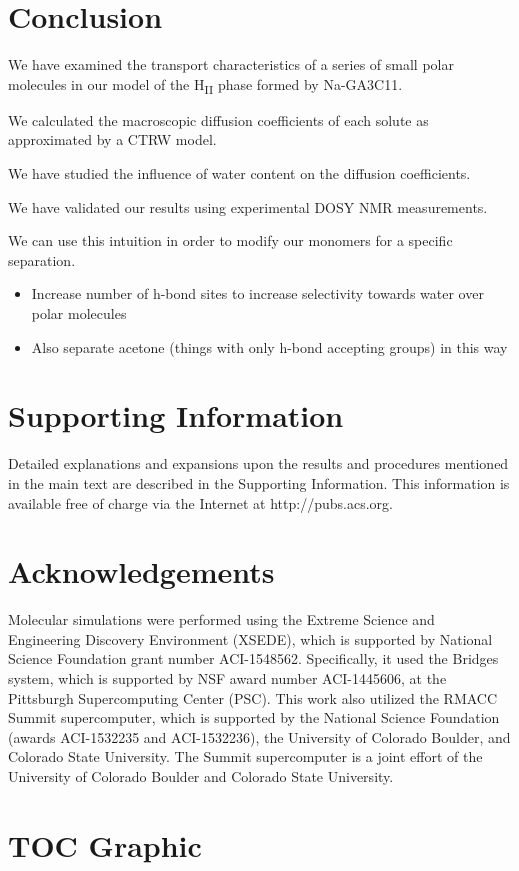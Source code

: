 \documentclass{article}
\begin{document}
   
  \section{Conclusion}

  We have examined the transport characteristics of a series of small polar
  molecules in our model of the H\textsubscript{II} phase formed by 
  Na-GA3C11.

  We calculated the macroscopic diffusion coefficients of each solute as 
  approximated by a CTRW model.

  We have studied the influence of water content on the diffusion coefficients.

  We have validated our results using experimental DOSY NMR measurements.

  We can use this intuition in order to modify our monomers for a specific 
  separation.
  \begin{itemize}
	\item Increase number of h-bond sites to increase selectivity towards water 
	over polar molecules
	\item Also separate acetone (things with only h-bond accepting groups) in this way
  \end{itemize}
  
 
  \section*{Supporting Information}

  Detailed explanations and expansions upon the results and procedures mentioned in
  the main text are described in the Supporting Information. This information is
  available free of charge via the Internet at http://pubs.acs.org.

  \section*{Acknowledgements}

  Molecular simulations were performed using the Extreme Science and
  Engineering Discovery Environment (XSEDE), which is supported by National
  Science Foundation grant number ACI-1548562. Specifically, it used the Bridges
  system, which is supported by NSF award number ACI-1445606, at the Pittsburgh
  Supercomputing Center (PSC). This work also utilized the RMACC Summit supercomputer,
  which is supported by the National Science Foundation (awards ACI-1532235 and
  ACI-1532236), the University of Colorado Boulder, and Colorado State
  University. The Summit supercomputer is a joint effort of the University of
  Colorado Boulder and Colorado State University.

  \clearpage
  

  \newpage

  \section*{TOC Graphic}
\end{document}
